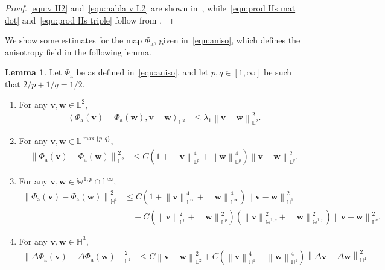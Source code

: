 \documentclass[11pt, reqno]{amsart}
\theoremstyle{definition}
\newtheorem{lemma}[theorem]{Lemma}
\numberwithin{equation}{section}
\newcommand{\bff}{\boldsymbol}
\newcommand{\bb}{\mathbb}
\newcommand{\norm}[2]{\left\|{#1}\right\|_{#2}}
\newcommand{\inpro}[2]{\left\langle#1,#2\right\rangle}
\begin{document}
\begin{proof}
	\eqref{equ:v H2} and~\eqref{equ:nabla v L2} are shown in~\cite[Lemma~3.3]{SoeTra23}, while~\eqref{equ:prod Hs mat dot} and~\eqref{equ:prod Hs triple} follow from \cite{Brezis}.
\end{proof}

We show some estimates for the map $\Phi_{\mathrm{a}}$, given in~\eqref{equ:aniso}, which defines the anisotropy field in the following lemma.

\begin{lemma}
Let $\Phi_{\mathrm{a}}$ be as defined in~\eqref{equ:aniso}, and let $p,q\in [1,\infty]$ be such that $2/p+1/q=1/2$. 
\begin{enumerate}
\item
For any $\bff{v},\bff{w}\in \bb{L}^2$,
\begin{align}\label{equ:Phi av Phi aw}
    \inpro{\Phi_{\mathrm{a}}(\bff{v})-\Phi_{\mathrm{a}}(\bff{w})}{\bff{v}-\bff{w}}_{\bb{L}^2}
    &\leq 
    \lambda_1 \norm{\bff{v}-\bff{w}}{\bb{L}^2}^2.
\end{align}
\item
For any $\bff{v},\bff{w}\in \bb{L}^{\max\{p,q\}}$,
\begin{align}
    \label{equ:Phi av aw norm}
    \norm{\Phi_{\mathrm{a}}(\bff{v})-\Phi_{\mathrm{a}}(\bff{w})}{\bb{L}^2}^2
    &\leq
    C \left(1+\norm{\bff{v}}{\bb{L}^p}^4+ \norm{\bff{w}}{\bb{L}^p}^4\right) \norm{\bff{v}-\bff{w}}{\bb{L}^q}^2.
\end{align}
\item
For any $\bff{v},\bff{w}\in \bb{W}^{1,p}\cap \bb{L}^\infty$,
\begin{align}\label{equ:norm H1 Phia}
    \norm{\Phi_{\mathrm{a}}(\bff{v})-\Phi_{\mathrm{a}}(\bff{w})}{\bb{H}^1}^2
    &\leq
    C\left(1+\norm{\bff{v}}{\bb{L}^\infty}^4 +\norm{\bff{w}}{\bb{L}^\infty}^4\right) \norm{\bff{v}-\bff{w}}{\bb{H}^1}^2
    \nonumber \\
    &\quad
    +
    C\left(\norm{\bff{v}}{\bb{L}^p}^2 + \norm{\bff{w}}{\bb{L}^p}^2 \right) \left(\norm{\bff{v}}{\bb{W}^{1,p}}^2 + \norm{\bff{w}}{\bb{W}^{1,p}}^2 \right) \norm{\bff{v}-\bff{w}}{\bb{L}^q}^2.
\end{align}
\item
For any $\bff{v},\bff{w}\in \bb{H}^3$,
\begin{align}\label{equ:Phi vw H2}
    \norm{\Delta\Phi_{\mathrm{a}}(\bff{v})- \Delta\Phi_{\mathrm{a}}(\bff{w})}{\bb{L}^2}^2
    &\leq
    C \norm{\bff{v}-\bff{w}}{\bb{L}^2}^2
    +
    C\left(\norm{\bff{v}}{\bb{H}^1}^4+ \norm{\bff{w}}{\bb{H}^1}^4 \right) \norm{\Delta\bff{v}-\Delta\bff{w}}{\bb{H}^1}^2 

\end{align}
\end{enumerate}
\end{lemma}
\end{document}
